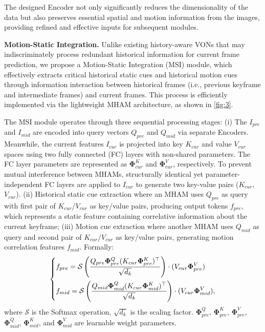 The designed Encoder not only significantly reduces the dimensionality of the data but also preserves essential spatial and motion information from the images, providing refined and effective inputs for subsequent modules.


\noindent\textbf{Motion-Static Integration.}
\label{para:tri-stream} 
Unlike existing history-aware VONs that may indiscriminately process redundant historical information for current frame prediction, we propose a Motion-Static Integration (MSI) module, which effectively extracts critical historical static cues and historical motion cues through information interaction between historical frames (i.e., previous keyframe and intermediate frames) and current frames. This process is efficiently implemented via the lightweight MHAM architecture, as shown in \cref{fig:3}. 

The MSI module operates through three sequential processing stages: (i) The $I_{pre}$ and $I_{mid}$ are encoded into query vectors $Q_{pre}$ and $Q_{mid}$ via separate Encoders. Meanwhile, the current features $I_{cur}$ is projected into key $K_{cur}$ and value $V_{cur}$ spaces using two fully connected (FC) layers with non-shared parameters. The FC layer parameters are represented as $\mathbf{\Phi}^K_{cur}$ and $\mathbf{\Phi}^V_{cur}$, respectively. To prevent mutual interference between MHAMs, structurally identical yet parameter-independent FC layers are applied to $I_{cur}$ to generate two key-value pairs ($K_{cur}$, $V_{cur}$). (ii) Historical static cue extraction where an MHAM uses $Q_{pre}$ as query with first pair of $K_{cur}$/$V_{cur}$ as key/value pairs, producing output tokens $f_{pre}$, which represents a static feature containing correlative information about the current keyframe; (iii) Motion cue extraction where another MHAM uses $Q_{mid}$ as query and second pair of $K_{cur}$/$V_{cur}$ as key/value pairs, generating motion correlation features $f_{mid}$. Formally: 
\begin{equation}
\begin{dcases}
f_{pre}=\mathcal{S}\left(\frac{Q_{pre}\mathbf{\Phi} _{pre}^Q (K_{cur}\mathbf{\Phi} _{pre}^K)^\top}{\sqrt{d_k}}\right)\cdot(V_{cur}\mathbf{\Phi} _{pre}^V)\\
f_{mid}=\mathcal{S}\left(\frac{Q_{mid}\mathbf{\Phi} _{mid}^Q  (K_{cur}\mathbf{\Phi} _{mid}^K)^\top}{\sqrt{d_k}}\right)\cdot(V_{cur}\mathbf{\Phi} _{mid}^V),
\end{dcases}
\label{eq:att}
\end{equation}
where $\mathcal{S}$ is the Softmax operation, $\sqrt{d_k}$ is the scaling factor. $\mathbf{\Phi}_{pre}^Q$, $\mathbf{\Phi}_{pre}^K$, $\mathbf{\Phi}_{pre}^V$, $\mathbf{\Phi}_{mid}^Q$, $\mathbf{\Phi}_{mid}^K$, and $\mathbf{\Phi}_{mid}^V$ are learnable weight parameters. 

